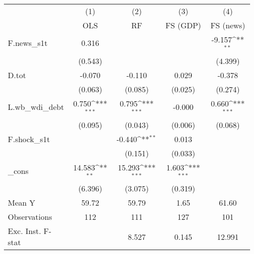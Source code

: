 {
\def\sym#1{\ifmmode^{#1}\else\(^{#1}\)\fi}
\begin{tabular}{l*{4}{c}}
\toprule
            &\multicolumn{1}{c}{(1)}&\multicolumn{1}{c}{(2)}&\multicolumn{1}{c}{(3)}&\multicolumn{1}{c}{(4)}\\
            &\multicolumn{1}{c}{OLS}&\multicolumn{1}{c}{RF}&\multicolumn{1}{c}{FS (GDP)}&\multicolumn{1}{c}{FS (news)}\\
\midrule
F.news\_s1t  &       0.316         &                     &                     &      -9.157\sym{**} \\
            &     (0.543)         &                     &                     &     (4.399)         \\
\addlinespace
D.tot       &      -0.070         &      -0.110         &       0.029         &      -0.378         \\
            &     (0.063)         &     (0.085)         &     (0.025)         &     (0.274)         \\
\addlinespace
L.wb\_wdi\_debt&       0.750\sym{***}&       0.795\sym{***}&      -0.000         &       0.660\sym{***}\\
            &     (0.095)         &     (0.043)         &     (0.006)         &     (0.068)         \\
\addlinespace
F.shock\_s1t &                     &      -0.440\sym{**} &       0.013         &                     \\
            &                     &     (0.151)         &     (0.033)         &                     \\
\addlinespace
\_cons      &      14.583\sym{**} &      15.293\sym{***}&       1.603\sym{***}&                     \\
            &     (6.396)         &     (3.075)         &     (0.319)         &                     \\
\midrule
Mean Y      &       59.72         &       59.79         &        1.65         &       61.60         \\
Observations&         112         &         111         &         127         &         101         \\
Exc. Inst. F-stat&                     &       8.527         &       0.145         &      12.991         \\
\bottomrule
\end{tabular}
}
